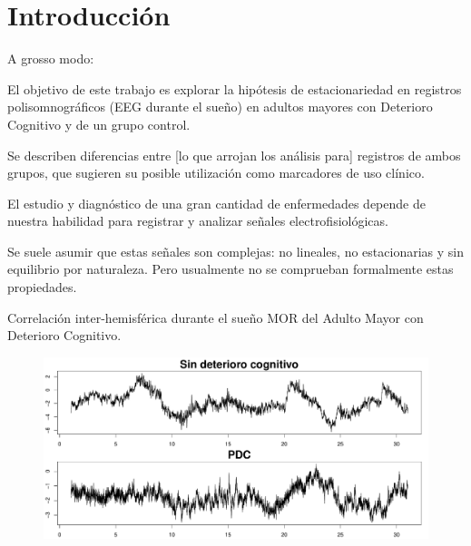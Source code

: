 \documentclass[12pt,a4paper]{mitthesis}
\begin{document}
\pagestyle{plain}

\newtheorem{defn}{Definici\'on}

\newcommand{\R}{\mathbb{R}}
\newcommand{\Var}[1]{\mathrm{Var}\left( #1 \right)}
\newcommand{\Cov}[1]{\mathrm{Cov}\left( #1 \right)}


\tableofcontents
\newpage


\chapter{Introducci\'on}

A grosso modo:

El objetivo de este trabajo es explorar la hip\'otesis de estacionariedad en registros
polisomnogr\'aficos (EEG durante el sue\~no) en adultos mayores con Deterioro Cognitivo y de
un grupo control.

Se describen diferencias entre [lo que arrojan los an\'alisis para] registros de ambos grupos, 
que sugieren su posible utilizaci\'on 
como marcadores de uso cl\'inico.

El estudio y diagnóstico de una gran cantidad de enfermedades depende de nuestra habilidad para
registrar y analizar se\~nales electrofisiol\'ogicas. 

Se suele asumir que estas se\~nales son complejas: no lineales, no estacionarias y sin equilibrio 
por naturaleza. Pero usualmente no se comprueban formalmente estas propiedades.

Correlaci\'on inter-hemisf\'erica durante el sueño MOR del Adulto Mayor con Deterioro Cognitivo.

\begin{figure}[h]
\centering
\includegraphics[width=.8\linewidth]{graficaintro.pdf}
\end{figure}
\end{document}
